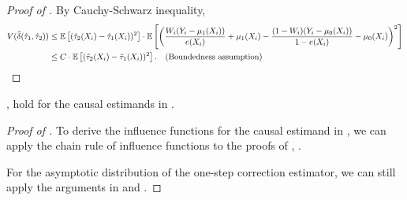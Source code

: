 \begin{proof}[Proof of ]
    By Cauchy-Schwarz inequality, 
    \begin{align*}
        V(\hat{\delta}(\hat{\tau}_1, \hat{\tau}_2))
        &\le \mathbb{E}\left[(\hat{\tau}_2(X_i) - \hat{\tau}_1(X_i))^2\right] \cdot \mathbb{E}\left[\left(\frac{W_i(Y_i - {\mu}_1(X_i))}{{e}(X_i)} + {\mu}_1(X_i) - \frac{(1-W_i)(Y_i - {\mu}_0(X_i))}{1-{e}(X_i)} - {\mu}_0(X_i)\right)^2\right] \\
        &\le C \cdot \mathbb{E}\left[(\hat{\tau}_2(X_i) - \hat{\tau}_1(X_i))^2\right].  \quad (\text{Boundedness assumption})
    \end{align*}
\end{proof}


\begin{corollary}[DINA]\label{prop:DINA}
    ,  hold for the causal estimands in .
\end{corollary}

\begin{proof}[Proof of \label{prop:DINA}]

    To derive the influence functions for the causal estimand in , we can apply the chain rule of influence functions to the proofs of , .

    For the asymptotic distribution of the one-step correction estimator, we can still apply the arguments in  and .
\end{proof}

